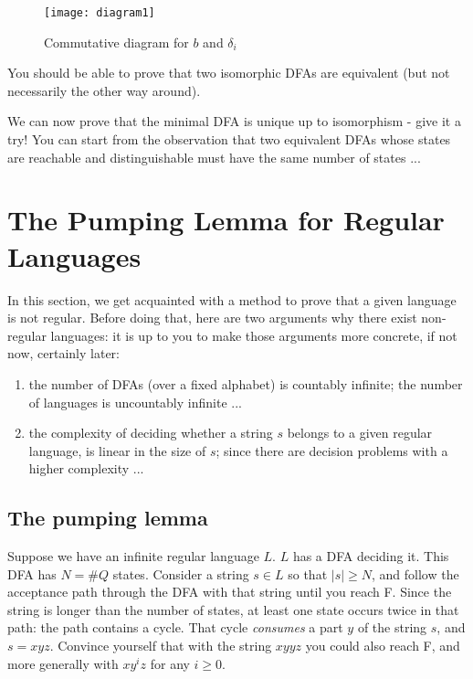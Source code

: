 \begin{figure}[h]
	\centering
	\texttt{[image: diagram1]}
	\caption{Commutative diagram for $b$ and $\delta_i$\label{diagram1}}
\end{figure}

You should be able to prove that two isomorphic DFAs are equivalent
(but not necessarily the other way around).

We can now prove that the minimal DFA is unique up to isomorphism -
give it a try! You can start from the observation that two equivalent
DFAs whose states are reachable and distinguishable must have the same
number of states ...




\section{The Pumping Lemma for Regular Languages}
In this section, we get acquainted with a method to prove that a given
language is not regular. Before doing that, here are two arguments why
there exist non-regular languages: it is up to you to make those
arguments more concrete, if not now, certainly later:
\begin{enumerate}

\item
the number of DFAs (over a fixed alphabet) is countably infinite; the
number of languages is uncountably infinite ...

\item
the complexity of deciding whether a string $s$ belongs to a given
regular language, is linear in the size of $s$; since there are
decision problems with a higher complexity ...

\end{enumerate}

\subsection{The pumping lemma}
Suppose we have an infinite regular language $L$. $L$ has a DFA
deciding it. This DFA has $N = \#Q$ states. Consider a string $s \in
L$ so that $|s| \geq N$, and follow the acceptance path through the DFA
with that string until you reach F. Since the string is longer than
the number of states, at least one state occurs twice in that path:
the path contains a cycle. That cycle {\em consumes} a part $y$ of the
string $s$, and $s = xyz$. Convince yourself
that with the string $xyyz$ you could also reach F, and more generally
with $xy^iz$ for any $i \geq 0$.

